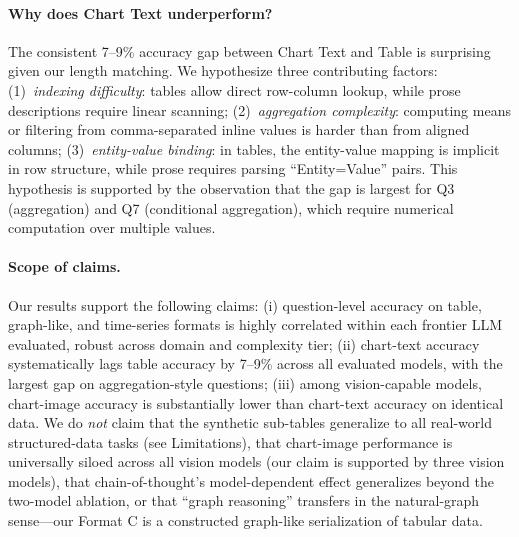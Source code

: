 \documentclass[11pt]{article}
\begin{document}
\paragraph{Why does Chart Text underperform?} The consistent 7--9\% accuracy gap between Chart Text and Table is surprising given our length matching. We hypothesize three contributing factors: (1)~\emph{indexing difficulty}: tables allow direct row-column lookup, while prose descriptions require linear scanning; (2)~\emph{aggregation complexity}: computing means or filtering from comma-separated inline values is harder than from aligned columns; (3)~\emph{entity-value binding}: in tables, the entity-value mapping is implicit in row structure, while prose requires parsing ``Entity=Value'' pairs. This hypothesis is supported by the observation that the gap is largest for Q3 (aggregation) and Q7 (conditional aggregation), which require numerical computation over multiple values.

\paragraph{Scope of claims.} Our results support the following claims: (i) question-level accuracy on table, graph-like, and time-series formats is highly correlated within each frontier LLM evaluated, robust across domain and complexity tier; (ii) chart-text accuracy systematically lags table accuracy by 7--9\% across all evaluated models, with the largest gap on aggregation-style questions; (iii) among vision-capable models, chart-image accuracy is substantially lower than chart-text accuracy on identical data. We do \emph{not} claim that the synthetic sub-tables generalize to all real-world structured-data tasks (see Limitations), that chart-image performance is universally siloed across all vision models (our claim is supported by three vision models), that chain-of-thought's model-dependent effect generalizes beyond the two-model ablation, or that ``graph reasoning'' transfers in the natural-graph sense---our Format C is a constructed graph-like serialization of tabular data.
\end{document}
